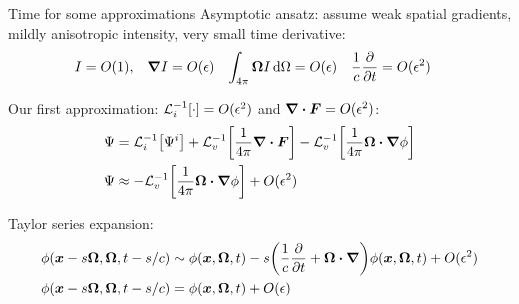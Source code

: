 \documentclass{beamer}
\begin{document}
\begin{frame}{Time for some approximations}
  Asymptotic ansatz: assume weak spatial gradients, mildly anisotropic intensity, very small time
  derivative:
\begin{align*}
  I &= O(1), &
  \bm{\nabla} I &= O(\epsilon)&
  \int_{4\pi} \bm{\Omega} I\mathop{}\!\mathrm{d} \Omega &= O(\epsilon)&
  \frac{1}{c} \frac{\partial }{\partial t} &= O(\epsilon^2)
\end{align*}

Our first approximation: $\mathcal{L}_{i}^{-1}\!\left[\cdot\right] = O(\epsilon^2)$ and $\bm{\nabla} \bm{\cdot} \bm{F} =
O(\epsilon^2)$:
\begin{align*}
  \Psi &= \mathcal{L}_{i}^{-1}\!\left[\Psi^i\right]
  + \mathcal{L}_{v}^{-1}\!\left[\frac{1}{4\pi} \bm{\nabla} \bm{\cdot}\bm{F}\right] -
  \mathcal{L}_{v}^{-1}\!\left[\frac{1}{4\pi} \bm{\Omega}\bm{\cdot} \bm{\nabla} \phi\right]
    \\ 
  \Psi 
  &\approx - \mathcal{L}_{v}^{-1}\!\left[\frac{1}{4\pi} \bm{\Omega}\bm{\cdot} \bm{\nabla} \phi\right]
  + O(\epsilon^2)
\end{align*}

Taylor series expansion:
\begin{align} \nonumber
  \phi(\bm{x} - s\bm{\Omega}, \bm{\Omega}, t - s/c)
  &\sim \phi(\bm{x}, \bm{\Omega}, t)
  - s \bigg( \frac{1}{c} \frac{\partial }{\partial t} + \bm{\Omega} \bm{\cdot} \bm{\nabla} \bigg)
  \phi(\bm{x}, \bm{\Omega}, t) + O(\epsilon^2)
\\ \label{eq:taylorPhi}
\phi(\bm{x} - s\bm{\Omega}, \bm{\Omega}, t - s/c)
&= \phi(\bm{x}, \bm{\Omega}, t) + O(\epsilon)
\end{align}
\end{frame}
\end{document}
